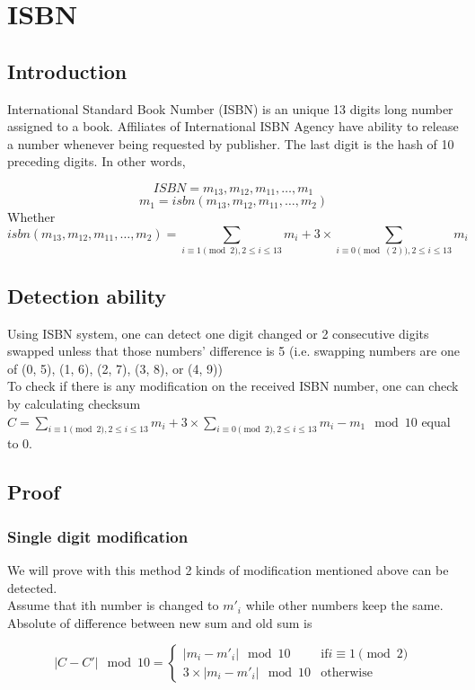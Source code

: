 \chapter{ISBN}
\section{Introduction}
International Standard Book Number (ISBN) is an unique 13 digits long number assigned to a book. Affiliates of International ISBN Agency have ability to release a number whenever being requested by publisher. The last digit is the hash of 10 preceding digits. In other words,

$$
ISBN = m_{13}, m_{12}, m_{11}, \ldots, m_1
$$
$$
m_1 = isbn(m_{13}, m_{12}, m_{11}, \ldots, m_2)
$$
Whether
$$
isbn(m_{13}, m_{12}, m_{11}, \ldots, m_2) = \sum_{i \equiv 1 \pmod{2}, 2\leq i \leq 13} m_i + 3 \times \sum_{i \equiv 0 \pmod(2), 2\leq i \leq 13 }m_i
$$

\section{Detection ability}
Using ISBN system, one can detect one digit changed or 2 consecutive digits swapped unless that those numbers' difference is 5 (i.e. swapping numbers are one of (0, 5), (1, 6), (2, 7), (3, 8), or (4, 9))\\

To check if there is any modification on the received ISBN number, one can check by calculating checksum $C = \sum_{i \equiv 1 \pmod{2}, 2\leq i \leq 13} m_i + 3 \times \sum_{i \equiv 0 \pmod{2}, 2\leq i \leq 13 }m_i - m_1 \mod 10$ equal to 0.\\

\section{Proof}
\subsection{Single digit modification}
We will prove with this method 2 kinds of modification mentioned above can be detected.\\
Assume that ith number is changed to $m'_i$ while other numbers keep the same. Absolute of difference between new sum and old sum is

$$
|C - C'| \mod 10 =
\begin{cases}
|m_i - m'_i| \mod 10 &\text{if} i \equiv 1 \pmod{2}
\\
 3 \times |m_i - m'_i| \mod 10 &\text{otherwise}
\end{cases}
$$


